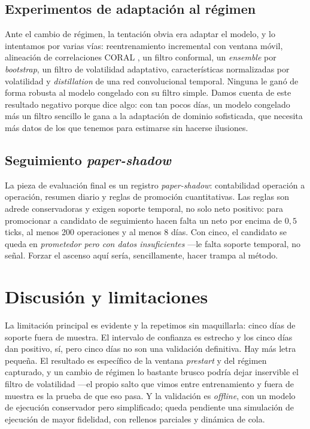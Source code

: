 \documentclass[11pt,a4paper]{article}
\begin{document}
\subsection{Experimentos de adaptación al régimen}

Ante el cambio de régimen, la tentación obvia era adaptar el modelo, y lo
intentamos por varias vías: reentrenamiento incremental con ventana móvil,
alineación de correlaciones CORAL \cite{sun2016coral}, un filtro conformal, un
\emph{ensemble} por \emph{bootstrap}, un filtro de volatilidad adaptativo,
características normalizadas por volatilidad y \emph{distillation} de una red
convolucional temporal. Ninguna le ganó de forma robusta al modelo congelado con su
filtro simple. Damos cuenta de este resultado negativo porque dice algo: con tan
pocos días, un modelo congelado más un filtro sencillo le gana a la adaptación de
dominio sofisticada, que necesita más datos de los que tenemos para estimarse sin
hacerse ilusiones.

\subsection{Seguimiento \emph{paper-shadow}}

La pieza de evaluación final es un registro \emph{paper-shadow}: contabilidad
operación a operación, resumen diario y reglas de promoción cuantitativas. Las
reglas son adrede conservadoras y exigen soporte temporal, no solo neto positivo:
para promocionar a candidato de seguimiento hacen falta un neto por encima de
$0{,}5$ ticks, al menos 200 operaciones y al menos 8 días. Con cinco, el candidato
se queda en \emph{prometedor pero con datos insuficientes} ---le falta soporte
temporal, no señal. Forzar el ascenso aquí sería, sencillamente, hacer trampa al
método.

\section{Discusión y limitaciones}

La limitación principal es evidente y la repetimos sin maquillarla: cinco días de
soporte fuera de muestra. El intervalo de confianza es estrecho y los cinco días dan
positivo, sí, pero cinco días no son una validación definitiva. Hay más letra
pequeña. El resultado es específico de la ventana \emph{prestart} y del régimen
capturado, y un cambio de régimen lo bastante brusco podría dejar inservible el
filtro de volatilidad ---el propio salto que vimos entre entrenamiento y fuera de
muestra es la prueba de que eso pasa. Y la validación es \emph{offline}, con un
modelo de ejecución conservador pero simplificado; queda pendiente una simulación de
ejecución de mayor fidelidad, con rellenos parciales y dinámica de cola.
\end{document}
